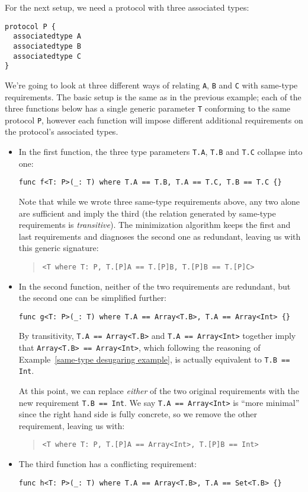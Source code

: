 \documentclass[../generics]{subfiles}
\begin{document}
\begin{example}\label{same-type minimization example}
For the next setup, we need a protocol with three associated types:
\begin{Verbatim}
protocol P {
  associatedtype A
  associatedtype B
  associatedtype C
}
\end{Verbatim}
We're going to look at three different ways of relating \texttt{A}, \texttt{B} and \texttt{C} with same-type requirements. The basic setup is the same as in the previous example; each of the three functions below has a single generic parameter \texttt{T} conforming to the same protocol \texttt{P}, however each function will impose different additional requirements on the protocol's associated types.
\begin{itemize}
\item In the first function, the three type parameters \texttt{T.A}, \texttt{T.B} and \texttt{T.C} collapse into one:
\begin{Verbatim}
func f<T: P>(_: T) where T.A == T.B, T.A == T.C, T.B == T.C {}
\end{Verbatim}
Note that while we wrote three same-type requirements above, any two alone are sufficient and imply the third (the relation generated by same-type requirements is \emph{transitive}). The minimization algorithm keeps the first and last requirements and diagnoses the second one as redundant, leaving us with this generic signature:
\begin{quote}
\begin{verbatim}
<T where T: P, T.[P]A == T.[P]B, T.[P]B == T.[P]C>
\end{verbatim}
\end{quote}
\item In the second function, neither of the two requirements are redundant, but the second one can be simplified further:
\begin{Verbatim}
func g<T: P>(_: T) where T.A == Array<T.B>, T.A == Array<Int> {}
\end{Verbatim}
By transitivity, \verb|T.A == Array<T.B>| and \verb|T.A == Array<Int>| together imply that \verb|Array<T.B> == Array<Int>|, which following the reasoning of Example~\ref{same-type desugaring example}, is actually equivalent to \verb|T.B == Int|.

At this point, we can replace \emph{either} of the two original requirements with the new requirement \verb|T.B == Int|. We say \verb|T.A == Array<Int>| is ``more minimal'' since the right hand side is fully concrete, so we remove the other requirement, leaving us with:
\begin{quote}
\begin{verbatim}
<T where T: P, T.[P]A == Array<Int>, T.[P]B == Int>
\end{verbatim}
\end{quote}
\item The third function has a conflicting requirement:
\begin{Verbatim}
func h<T: P>(_: T) where T.A == Array<T.B>, T.A == Set<T.B> {}


\end{Verbatim}
\end{itemize}
\end{example}
\end{document}
